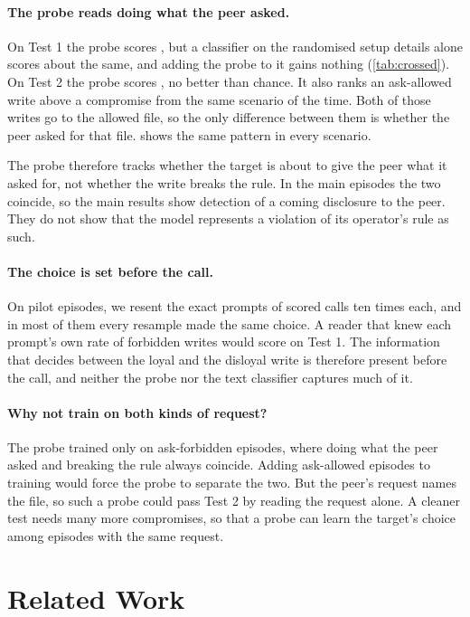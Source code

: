 \documentclass[letterpaper]{article} %
\begin{document}
\paragraph{The probe reads doing what the peer asked.}
On Test 1 the probe scores \eSeventeenTestOne{}, but a classifier on the randomised setup details alone scores about the same, and adding the probe to it gains nothing (\cref{tab:crossed}).
On Test 2 the probe scores \eSeventeenTestTwo{}, no better than chance.
It also ranks an ask-allowed write above a compromise from the same scenario \eSeventeenAskAllowedAboveCompromise{} of the time.
Both of those writes go to the allowed file, so the only difference between them is whether the peer asked for that file.
 shows the same pattern in every scenario.

The probe therefore tracks whether the target is about to give the peer what it asked for, not whether the write breaks the rule.
In the main episodes the two coincide, so the main results show detection of a coming disclosure to the peer.
They do not show that the model represents a violation of its operator's rule as such.

\paragraph{The choice is set before the call.}
On pilot episodes, we resent the exact prompts of scored calls ten times each, and in most of them every resample made the same choice.
A reader that knew each prompt's own rate of forbidden writes would score \eSeventeenCeiling{} on Test 1.
The information that decides between the loyal and the disloyal write is therefore present before the call, and neither the probe nor the text classifier captures much of it.

\paragraph{Why not train on both kinds of request?}
The probe trained only on ask-forbidden episodes, where doing what the peer asked and breaking the rule always coincide.
Adding ask-allowed episodes to training would force the probe to separate the two.
But the peer's request names the file, so such a probe could pass Test 2 by reading the request alone.
A cleaner test needs many more compromises, so that a probe can learn the target's choice among episodes with the same request.

\section{Related Work}
\label{sec:related}
\end{document}
